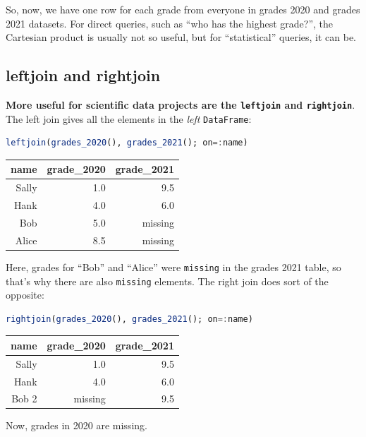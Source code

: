 \documentclass[
  notoc %
]{tufte-book}
\newcommand{\passthrough}[1]{#1}
\begin{document}
So, now, we have one row for each grade from everyone in grades 2020 and
grades 2021 datasets. For direct queries, such as ``who has the highest
grade?'', the Cartesian product is usually not so useful, but for
``statistical'' queries, it can be.

\hypertarget{sec:leftjoin_rightjoin}{%
\subsection{leftjoin and rightjoin}\label{sec:leftjoin_rightjoin}}

\textbf{More useful for scientific data projects are the
\passthrough{\lstinline!leftjoin!} and
\passthrough{\lstinline!rightjoin!}}. The left join gives all the
elements in the \emph{left} \passthrough{\lstinline!DataFrame!}:

\begin{lstlisting}[language=Julia]
leftjoin(grades_2020(), grades_2021(); on=:name)
\end{lstlisting}

\begin{longtable}[]{@{}rrr@{}}
\toprule()
name & grade\_2020 & grade\_2021 \\
\midrule()
\endhead
Sally & 1.0 & 9.5 \\
Hank & 4.0 & 6.0 \\
Bob & 5.0 & missing \\
Alice & 8.5 & missing \\
\bottomrule()
\end{longtable}

Here, grades for ``Bob'' and ``Alice'' were
\passthrough{\lstinline!missing!} in the grades 2021 table, so that's
why there are also \passthrough{\lstinline!missing!} elements. The right
join does sort of the opposite:

\begin{lstlisting}[language=Julia]
rightjoin(grades_2020(), grades_2021(); on=:name)
\end{lstlisting}

\begin{longtable}[]{@{}rrr@{}}
\toprule()
name & grade\_2020 & grade\_2021 \\
\midrule()
\endhead
Sally & 1.0 & 9.5 \\
Hank & 4.0 & 6.0 \\
Bob 2 & missing & 9.5 \\
\bottomrule()
\end{longtable}

Now, grades in 2020 are missing.
\end{document}
